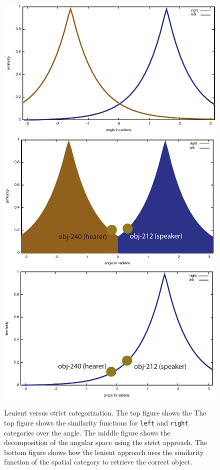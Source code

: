 \begin{figure}
\begin{center}
\includegraphics[width=0.6\columnwidth]{figs/lenient-vs-strict-interpretation}
\includegraphics[width=0.6\columnwidth]{figs/lenient-vs-strict-interpretation-strict}
\includegraphics[width=0.6\columnwidth]{figs/lenient-vs-strict-interpretation-lenient}
\end{center}
\caption[Lenient vs strict categorization]{
Lenient versus strict categorization. The top figure shows the 
The top figure shows 
the similarity functions for {\footnotesize\tt left} and {\footnotesize\tt right} 
categories over the angle. The middle figure shows the decomposition
of the angular space using the strict approach. The bottom figure shows
how the lenient approach uses the similarity function of the spatial category
to retrieve the correct object.
}
\label{f:lenient-vs-strict}
\end{figure}

